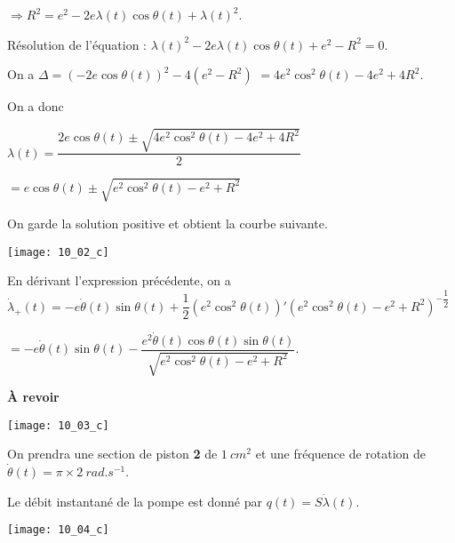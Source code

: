$\Rightarrow R^2 =e^2 -2e\lambda(t)\cos\theta(t)+\lambda(t)^2$.

Résolution de l'équation :
$\lambda(t)^2-2e\lambda(t)\cos\theta(t)+e^2 -R^2=0$.

On  a $\Delta = \left(-2e\cos\theta(t)\right)^2-4\left(e^2 -R^2\right)$
$ =4e^2\cos^2\theta(t)-4e^2+4R^2$.

On a donc 

$ \lambda(t)= \dfrac{2e\cos\theta(t)\pm \sqrt{4e^2\cos^2\theta(t)-4e^2+4R^2}}{2}$

$  =e\cos\theta(t)\pm \sqrt{e^2\cos^2\theta(t)-e^2+R^2}$
\else
\fi

\ifprof
On garde la solution positive et obtient la courbe suivante.

\begin{center}
\texttt{[image: 10\_02\_c]}
\end{center}

\else
\fi


\ifprof

En dérivant l'expression précédente, on a 
$ \dot{\lambda}_{+}(t)= -e\dot{\theta}(t)\sin\theta(t)+  \dfrac{1}{2}\left( e^2\cos^2\theta(t)\right)'\left( e^2\cos^2\theta(t)-e^2+R^2\right)^{-\dfrac{1}{2}} $

$= -e\dot{\theta}(t)\sin\theta(t)-  \dfrac{ e^2\dot{\theta}(t)\cos\theta(t)\sin\theta(t)}{ \sqrt{e^2\cos^2\theta(t)-e^2+R^2}}$.

 \textbf{À revoir}
\begin{center}
\texttt{[image: 10\_03\_c]}
\end{center}

\else
\fi

\ifprof
\else
On prendra une section de piston \textbf{2} de $\SI{1}{cm^2}$ et une fréquence de rotation de $\dot{\theta}(t)=\pi\times \SI{2}{rad.s^{-1}}$.
\fi
{}

\ifprof
Le débit instantané de la pompe est donné par $q(t)=S\dot{\lambda}(t)$.
\else
\fi



\ifprof
\begin{center}
\texttt{[image: 10\_04\_c]}
\end{center}
\else
\fi

